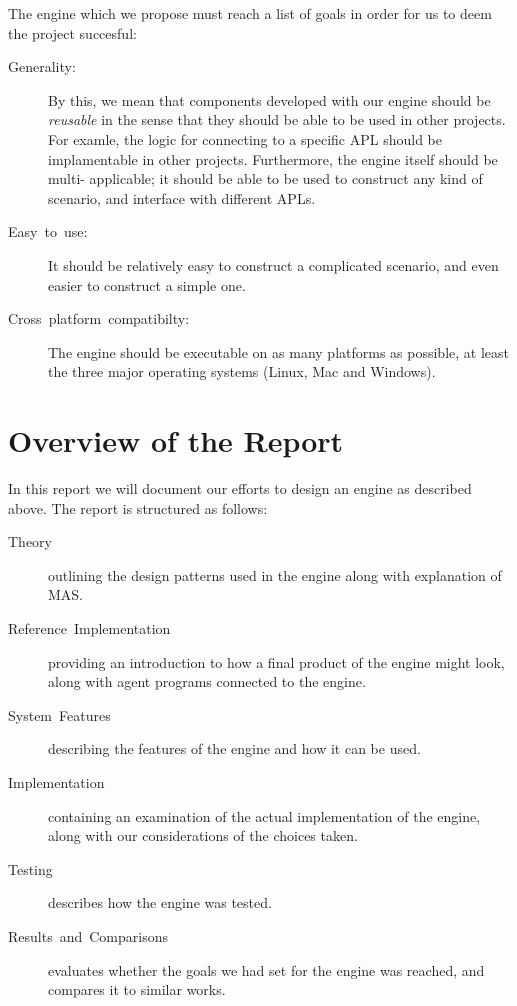 The engine which we propose must reach a list of goals in order for
us to deem the project succesful:
\begin{description}
\item [{Generality:}] By this, we mean that components developed with our
engine should be \emph{reusable} in the sense that they should be
able to be used in other projects. For examle, the logic for connecting
to a specific APL should be implamentable in other projects. Furthermore,
the engine itself should be multi- applicable; it should be able to
be used to construct any kind of scenario, and interface with different
APLs.
\item [{Easy~to~use:}] It should be relatively easy to construct a complicated
scenario, and even easier to construct a simple one.
\item [{Cross~platform~compatibilty:}] The engine should be executable
on as many platforms as possible, at least the three major operating
systems (Linux, Mac and Windows).
\end{description}

\section*{Overview of the Report}

In this report we will document our efforts to design an engine as
described above. The report is structured as follows: 
\begin{description}
\item [{Theory}] outlining the design patterns used in the engine along
with explanation of MAS.
\item [{Reference~Implementation}] providing an introduction to how a
final product of the engine might look, along with agent programs
connected to the engine.
\item [{System~Features}] describing the features of the engine and how
it can be used.
\item [{Implementation}] containing an examination of the actual implementation
of the engine, along with our considerations of the choices taken.
\item [{Testing}] describes how the engine was tested.
\item [{Results~and~Comparisons}] evaluates whether the goals we had
set for the engine was reached, and compares it to similar works.\end{description}


